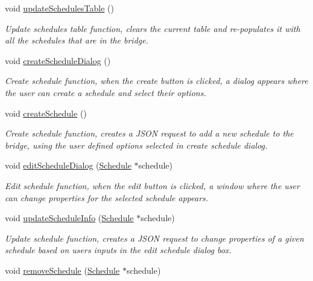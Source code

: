 \begin{DoxyCompactItemize}
void \hyperlink{classLightManagementWidget_a8269fdb02b41728a474d07830743b61f}{update\+Schedules\+Table} ()
\begin{DoxyCompactList}\small\item\em Update schedules table function, clears the current table and re-\/populates it with all the schedules that are in the bridge. \end{DoxyCompactList}\item 
void \hyperlink{classLightManagementWidget_a387f9ca2f98907351c63ebac6d1e70fe}{create\+Schedule\+Dialog} ()
\begin{DoxyCompactList}\small\item\em Create schedule function, when the create button is clicked, a dialog appears where the user can create a schedule and select their options. \end{DoxyCompactList}\item 
void \hyperlink{classLightManagementWidget_a016342be1f2ecb2f805405d1e68399e7}{create\+Schedule} ()
\begin{DoxyCompactList}\small\item\em Create schedule function, creates a J\+S\+ON request to add a new schedule to the bridge, using the user defined options selected in create schedule dialog. \end{DoxyCompactList}\item 
void \hyperlink{classLightManagementWidget_aaa66e284cf4bbc7c1127ae9d325e41a2}{edit\+Schedule\+Dialog} (\hyperlink{classSchedule}{Schedule} $\ast$schedule)
\begin{DoxyCompactList}\small\item\em Edit schedule function, when the edit button is clicked, a window where the user can change properties for the selected schedule appears. \end{DoxyCompactList}\item 
void \hyperlink{classLightManagementWidget_ac6a0c7163e0e383c55d72490d1ded36b}{update\+Schedule\+Info} (\hyperlink{classSchedule}{Schedule} $\ast$schedule)
\begin{DoxyCompactList}\small\item\em Update schedule function, creates a J\+S\+ON request to change properties of a given schedule based on user\textquotesingle{}s inputs in the edit schedule dialog box. \end{DoxyCompactList}\item 
void \hyperlink{classLightManagementWidget_af654e9b80fa36c3bde02464907d2745e}{remove\+Schedule} (\hyperlink{classSchedule}{Schedule} $\ast$schedule)

\end{DoxyCompactItemize}

